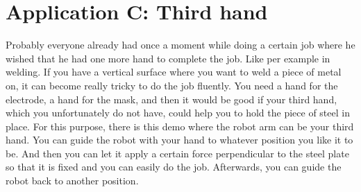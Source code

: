 \documentclass[11pt,a4paper]{report}
\begin{document}
\section{Application C: Third hand}
Probably everyone already had once a moment while doing a certain job where he wished that he had one more hand to complete the job. Like per example in welding. If you have a vertical surface where you want to weld a piece of metal on, it can become really tricky to do the job fluently. You need a hand for the electrode, a hand for the mask, and then it would be good if your third hand, which you unfortunately do not have, could help you to hold the piece of steel in place. For this purpose, there is this demo where the robot arm can be your third hand. You can guide the robot with your hand to whatever position you like it to be. And then you can let it apply a certain force perpendicular to the steel plate so that it is fixed and you can easily do the job. Afterwards, you can guide the robot back to another position.
\end{document}
